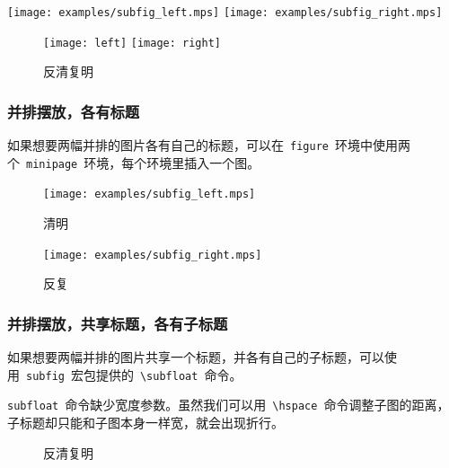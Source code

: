 \begin{fdemo}{
\centering
\texttt{[image: examples/subfig\_left.mps]}
\texttt{[image: examples/subfig\_right.mps]}
}
\begin{figure}[htbp]
\centering
\texttt{[image: left]}
\texttt{[image: right]}
\caption{反清复明}
\end{figure}
\end{fdemo}

\subsubsection{并排摆放，各有标题}
如果想要两幅并排的图片各有自己的标题，可以在~\verb|figure|~环境中使用两个~\verb|minipage|~环境，每个环境里插入一个图。

\begin{figure}[htbp]
\centering
\begin{minipage}[t]{0.3\textwidth}
    \centering
    \texttt{[image: examples/subfig\_left.mps]}
    \caption{清明}
\end{minipage}
\begin{minipage}[t]{0.3\textwidth}
    \centering
    \texttt{[image: examples/subfig\_right.mps]}
    \caption{反复}
\end{minipage}
\end{figure}

\subsubsection{并排摆放，共享标题，各有子标题}
如果想要两幅并排的图片共享一个标题，并各有自己的子标题，可以使用~\verb|subfig|~宏包提供的~\verb|\subfloat|~命令。

\verb|subfloat|~命令缺少宽度参数。虽然我们可以用~\verb|\hspace|~命令调整子图的距离，子标题却只能和子图本身一样宽，就会出现折行。
\begin{code}
\usepackage{subfig}
\begin{figure}[htbp]
\centering
{}
\hspace{80pt}
\caption{反清复明}
\end{figure}
\end{code}

